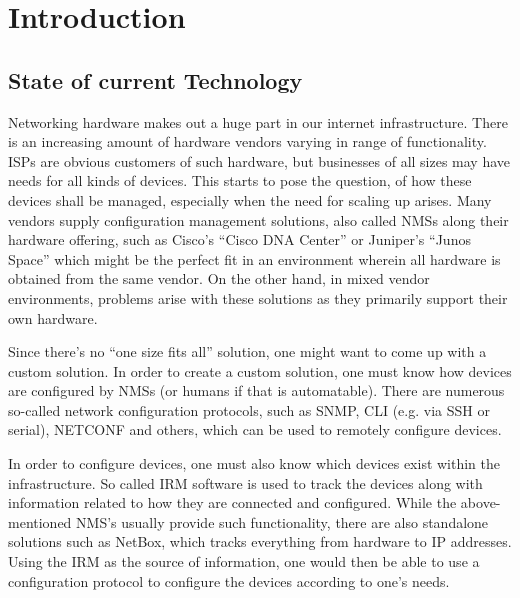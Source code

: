 \chapter{\label{introduction}Introduction}
\thispagestyle{fancy}


\section{\label{introduction-current}State of current Technology}

Networking hardware makes out a huge part in our internet infrastructure. 
There is an increasing amount of hardware vendors varying in range of functionality. 
\glspl{ISP} are obvious customers of such hardware, but businesses of all sizes may have needs for all kinds of devices. 
This starts to pose the question, of how these devices shall be managed, especially when the need for scaling up arises. 
Many vendors supply configuration management solutions, also called \glspl{NMS} along their hardware offering, 
such as Cisco's ``Cisco DNA Center\cite{noauthor_cisco_nodate}'' or Juniper's ``Junos Space\cite{noauthor_junos_nodate}'' 
which might be the perfect fit in an environment wherein all hardware is obtained from the same vendor.
On the other hand, in mixed vendor environments, 
problems arise with these solutions as they primarily support their own hardware.

Since there's no ``one size fits all'' solution, one might want to come up with a custom solution.
In order to create a custom solution, one must know how devices are configured by \acrshort{NMS}s 
(or humans if that is automatable). There are numerous so-called network configuration protocols, 
such as \acrshort{SNMP}\cite{fedor_simple_1990}, CLI (e.g. via SSH or serial), NETCONF\cite{enns_network_2011} and others,
which can be used to remotely configure devices.

In order to configure devices, one must also know which devices exist within the infrastructure.
So called \acrfull{IRM} software is used to track the devices along with
information related to how they are connected and configured. 
While the above-mentioned \acrshort{NMS}'s usually provide such functionality, there are also
standalone solutions such as NetBox, which tracks everything from hardware to IP addresses.
Using the \acrshort{IRM} as the source of information, one would then be able to use a configuration protocol
to configure the devices according to one's needs.

